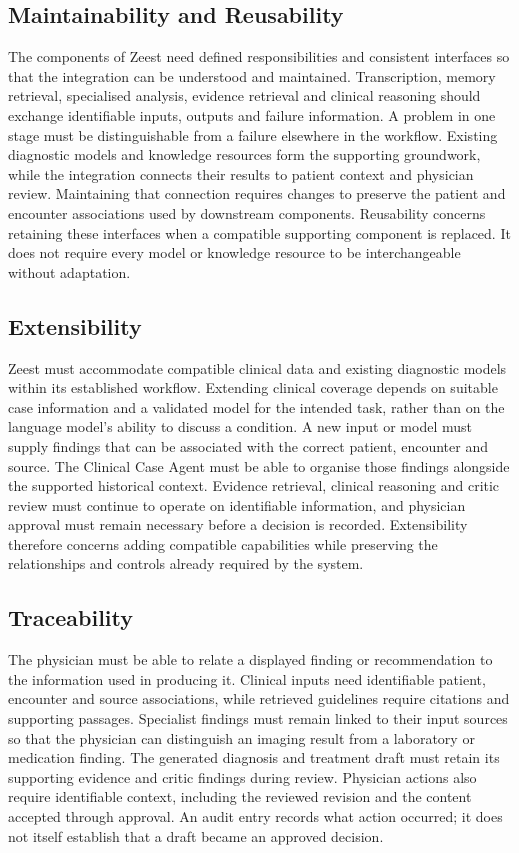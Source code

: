 \subsection{Maintainability and Reusability}
The components of Zeest need defined responsibilities and consistent interfaces so that the integration can be understood and maintained. Transcription, memory retrieval, specialised analysis, evidence retrieval and clinical reasoning should exchange identifiable inputs, outputs and failure information. A problem in one stage must be distinguishable from a failure elsewhere in the workflow. Existing diagnostic models and knowledge resources form the supporting groundwork, while the integration connects their results to patient context and physician review. Maintaining that connection requires changes to preserve the patient and encounter associations used by downstream components. Reusability concerns retaining these interfaces when a compatible supporting component is replaced. It does not require every model or knowledge resource to be interchangeable without adaptation.

\subsection{Extensibility}
Zeest must accommodate compatible clinical data and existing diagnostic models within its established workflow. Extending clinical coverage depends on suitable case information and a validated model for the intended task, rather than on the language model's ability to discuss a condition. A new input or model must supply findings that can be associated with the correct patient, encounter and source. The Clinical Case Agent must be able to organise those findings alongside the supported historical context. Evidence retrieval, clinical reasoning and critic review must continue to operate on identifiable information, and physician approval must remain necessary before a decision is recorded. Extensibility therefore concerns adding compatible capabilities while preserving the relationships and controls already required by the system.

\subsection{Traceability}
The physician must be able to relate a displayed finding or recommendation to the information used in producing it. Clinical inputs need identifiable patient, encounter and source associations, while retrieved guidelines require citations and supporting passages. Specialist findings must remain linked to their input sources so that the physician can distinguish an imaging result from a laboratory or medication finding. The generated diagnosis and treatment draft must retain its supporting evidence and critic findings during review. Physician actions also require identifiable context, including the reviewed revision and the content accepted through approval. An audit entry records what action occurred; it does not itself establish that a draft became an approved decision.

